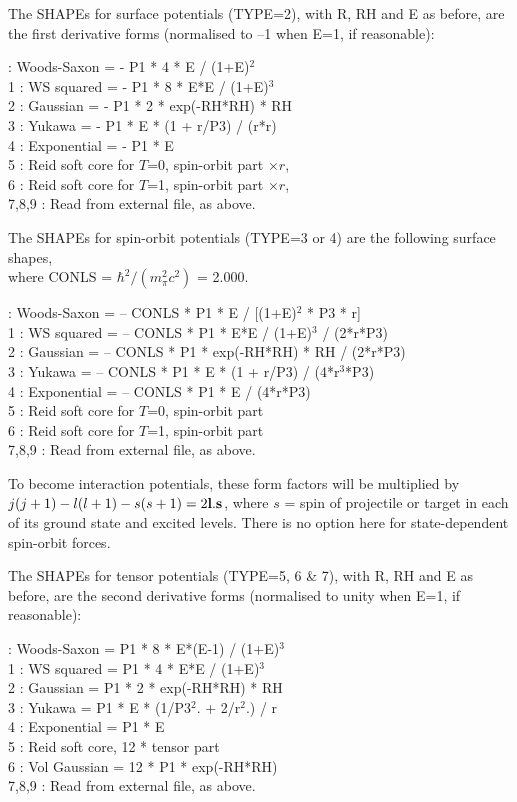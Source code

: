 \documentclass[11pt]{article}
\begin{document}
The SHAPEs for surface potentials (TYPE=2), with R, RH and E as before,
are the first derivative forms (normalised to --1 when E=1,
if reasonable):

 : Woods-Saxon  = - P1 * 4 * E / (1+E)$^2$ \\
      1 : WS squared   = - P1 * 8 * E*E / (1+E)$^3$\\
      2 : Gaussian     = - P1 * 2 * exp(-RH*RH) * RH\\
      3 : Yukawa       = - P1 * E * (1 + r/P3) / (r*r)\\
      4 : Exponential  = - P1 * E\\
      5 : Reid soft core for $T$=0, spin-orbit part $\times r$,\\
      6 : Reid soft core for $T$=1, spin-orbit part $\times r$,\\
      7,8,9 : Read from external file, as above.
\bigskip

The SHAPEs for spin-orbit potentials (TYPE=3 or 4) are the following surface
shapes, \\ where CONLS = $\hbar^2/(m_\pi^2 c^2)$ = 2.000.

 : Woods-Saxon  = -- CONLS * P1 *  E / [(1+E)$^2$ * P3 * r] \\
      1 : WS squared   = -- CONLS * P1 * E*E / (1+E)$^3$  / (2*r*P3) \\
      2 : Gaussian     = -- CONLS * P1 * exp(-RH*RH) * RH  / (2*r*P3) \\
      3 : Yukawa       = -- CONLS * P1 * E * (1 + r/P3) / (4*r$^3$*P3)\\
      4 : Exponential  = -- CONLS * P1 * E / (4*r*P3)\\
      5 : Reid soft core for $T$=0, spin-orbit part\\
      6 : Reid soft core for $T$=1, spin-orbit part\\
      7,8,9 : Read from external file, as above.

To become interaction potentials,
these form factors will be multiplied by
$j(j+1) - l(l+1) - s(s+1)= 2{\bf l}.{\bf s}$, where $s$ = spin of projectile or target
in each of its ground state and excited levels. There is no option here for
state-dependent spin-orbit forces.
\bigskip

The SHAPEs for tensor potentials (TYPE=5, 6 \& 7), with R, RH and E as before,
are the second derivative forms (normalised to unity when E=1,
if reasonable):

 : Woods-Saxon  = P1 * 8 * E*(E-1) / (1+E)$^3$\\
      1 : WS squared   = P1 * 4 * E*E / (1+E)$^3$\\
      2 : Gaussian     = P1 * 2 * exp(-RH*RH) * RH\\
      3 : Yukawa       = P1 * E * (1/P3$^2$. + 2/r$^2$.) / r\\
      4 : Exponential  = P1 * E\\
      5 : Reid soft core, 12 * tensor part\\
      6 : Vol Gaussian = 12 * P1 * exp(-RH*RH)\\
      7,8,9 : Read from external file, as above.
\end{document}
